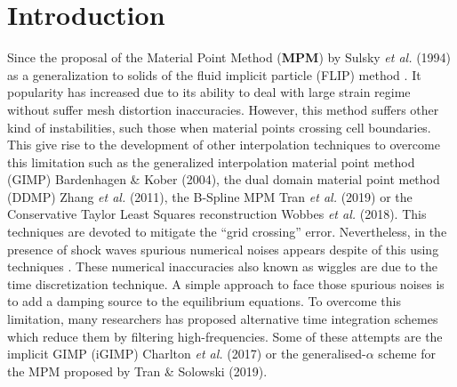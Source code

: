 \section{Introduction}
\label{intro}
Since the proposal of the Material Point Method (\textbf{MPM}) by
Sulsky {\it  et al.} (1994)\cite{Sulsky1994} as a generalization to
solids of the fluid implicit particle (FLIP) method
\cite{Brackbill1986}. It popularity has increased due to its ability
to deal with large strain regime without suffer mesh distortion
inaccuracies. However, this method suffers other kind of
instabilities, such those when material points crossing cell
boundaries. This give rise to the development of other interpolation
techniques to overcome this limitation such as the generalized
interpolation material point method (GIMP) Bardenhagen \& Kober
(2004)\cite{Bardenhagen2004}, the dual
domain material point method (DDMP) Zhang {\it et al.}
(2011)\cite{Zhang2011a}, the B-Spline MPM Tran {\it et al.}
(2019)\cite{Tran2019a} or the Conservative Taylor
Least Squares reconstruction Wobbes {\it et al.}
(2018)\cite{E_Wobbes_2018}. This techniques are devoted to mitigate the
``grid crossing'' error.
Nevertheless, in the presence of shock waves spurious
numerical noises appears despite of this using techniques \cite{Tran2019e}. These numerical
inaccuracies also known as wiggles are due to the time discretization
technique. A simple approach to face those spurious noises is to add a
damping source to the equilibrium equations. To overcome this
limitation, many researchers has proposed alternative time integration
schemes which reduce them by filtering high-frequencies. Some of these
attempts are the implicit GIMP (iGIMP) Charlton {\it et al.}
(2017)\nocite{Charlton2017} or the generalised-$\alpha$ scheme for the
MPM proposed by Tran \& Solowski (2019)\nocite{Tran2019e}.

